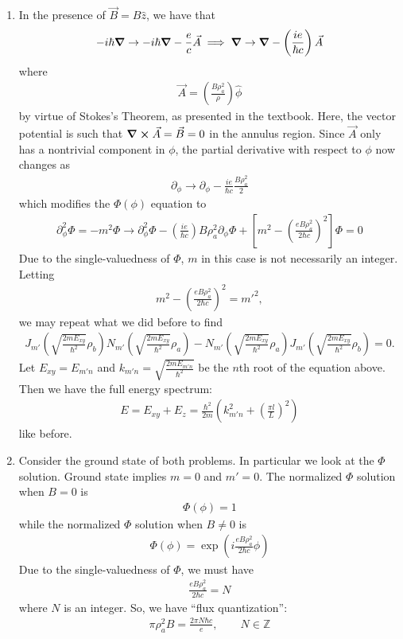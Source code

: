 \documentclass{article}
\theoremstyle{definition}
\newcommand{\p}{\partial}
\newcommand{\f}[2]{\frac{#1}{#2}}
\newcommand{\lp}{\left(}
\newcommand{\rp}{\right)}
\newcommand{\lb}{\left[}
\newcommand{\rb}{\right]}
\begin{document}
\begin{enumerate}[label=(\alph*)]
	
	\item In the presence of $\vec{B} = B \hat{z}$, we have that
	\begin{align*}
	-i\hbar \grad  \to -i\hbar \grad - \f{e}{c}\vec{A} \implies \grad \to \grad - \lp \f{ie}{\hbar c} \rp \vec{A} 
	\end{align*}
	where
	\begin{align*}
	\vec{A} = \lp \f{B\rho_a^2}{\rho} \rp \hat{\phi}
	\end{align*}
	by virtue of Stokes's Theorem, as presented in the textbook. Here, the vector potential is such that $\curl \vec{A} = \vec{B} = 0$ in the annulus region.  Since $\vec{A}$ only has a nontrivial component in $\phi$, the partial derivative with respect to $\phi$ now changes as
	\begin{align*}
	\p_\phi \to \p_\phi - \f{ie}{\hbar c} \f{B\rho_a^2}{2}
	\end{align*}
	which modifies the $\Phi(\phi)$ equation to
	\begin{align*}
	\p^2_\phi \Phi = - m^2 \Phi \to \p_\phi^2 \Phi - \lp \f{ie}{\hbar c} \rp B\rho_a^2 \p_\phi \Phi + \lb m^2 - \lp \f{eB \rho_a^2}{2\hbar c} \rp^2 \rb \Phi = 0
	\end{align*}
	Due to the single-valuedness of $\Phi$, $m$ in this case is not necessarily an integer. Letting 
	\begin{align*}
	m^2 - \lp \f{eB \rho_a^2}{2\hbar c} \rp^2  = m'^2,
	\end{align*}
	we may repeat what we did before to find 
	\begin{align*}
	J_{m'}\lp\sqrt{\f{2mE_{xy}}{\hbar^2}}\rho_b\rp N_{m'}\lp \sqrt{\f{2mE_{xy}}{\hbar^2}}\rho_a \rp - N_{m'}\lp \sqrt{\f{2mE_{xy}}{\hbar^2}}\rho_a \rp J_{m'}\lp \sqrt{\f{2mE_{xy}}{\hbar^2}}\rho_b \rp = 0.
	\end{align*}
	Let $E_{xy} = E_{m'n}$ and $k_{m'n} = \sqrt{\f{2mE_{m'n}}{\hbar^2}}$ be the $n$th root of the equation above. Then we have the full energy spectrum:
	\begin{align*}
	E = E_{xy} + E_z = \f{\hbar^2}{2m} \lp k_{m'n}^2 + \lp \f{\pi l}{L} \rp^2 \rp
	\end{align*}
	like before. 
	

	\item Consider the ground state of both problems. In particular we look at the $\Phi$ solution. Ground state implies $m=0$ and $m' = 0$. The normalized $\Phi$ solution when $B=0$ is 
	\begin{align*}
	\Phi(\phi) = 1
	\end{align*}
	while the normalized $\Phi$ solution when $B\neq 0$ is 
	\begin{align*}
	\Phi(\phi) = \exp\lp i\f{ eB\rho_a^2}{2\hbar c} \phi\rp 
	\end{align*}
	Due to the single-valuedness of $\Phi$, we must have
	\begin{align*}
	\f{ eB\rho_a^2}{2\hbar c} = N
	\end{align*}
	where $N$ is an integer. So, we have ``flux quantization'':
	\begin{align*}
	\pi \rho_a^2 B = \f{2\pi N \hbar c}{e}, \quad\quad N\in \mathbb{Z}
	\end{align*}
\end{enumerate}
\end{document}
